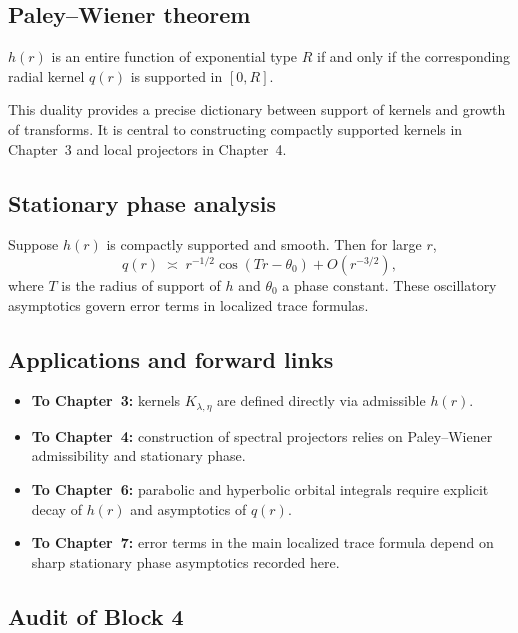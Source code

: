 \subsection{Paley–Wiener theorem}

\begin{theorem}
$h(r)$ is an entire function of exponential type $R$ if and only if the corresponding radial kernel $q(r)$ is supported in $[0,R]$. 
\end{theorem}

\begin{remark}
This duality provides a precise dictionary between support of kernels and growth of transforms. It is central to constructing compactly supported kernels in Chapter~3 and local projectors in Chapter~4.
\end{remark}

\subsection{Stationary phase analysis}

Suppose $h(r)$ is compactly supported and smooth.  
Then for large $r$,
\[
  q(r) \;\asymp\; r^{-1/2}\cos(Tr-\theta_0) + O(r^{-3/2}),
\]
where $T$ is the radius of support of $h$ and $\theta_0$ a phase constant.  
These oscillatory asymptotics govern error terms in localized trace formulas.

\subsection{Applications and forward links}

\begin{itemize}
  \item \textbf{To Chapter~3:} kernels $K_{\lambda,\eta}$ are defined directly via admissible $h(r)$.
  \item \textbf{To Chapter~4:} construction of spectral projectors relies on Paley–Wiener admissibility and stationary phase.
  \item \textbf{To Chapter~6:} parabolic and hyperbolic orbital integrals require explicit decay of $h(r)$ and asymptotics of $q(r)$.
  \item \textbf{To Chapter~7:} error terms in the main localized trace formula depend on sharp stationary phase asymptotics recorded here.
\end{itemize}

\subsection*{Audit of Block 4}

